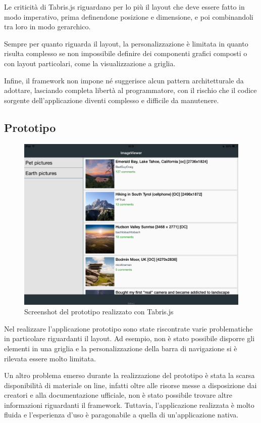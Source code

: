 Le criticità di Tabris.js riguardano per lo più il layout che deve essere fatto in modo imperativo, prima definendone posizione e dimensione, e poi combinandoli tra loro in modo gerarchico.

Sempre per quanto riguarda il layout, la personalizzazione è limitata in quanto risulta complesso se non impossibile definire dei componenti grafici composti o con layout particolari, come la visualizzazione a griglia.

Infine, il framework non impone né suggerisce alcun pattern architetturale da adottare, lasciando completa libertà al programmatore, con il rischio che il codice sorgente dell'applicazione diventi complesso e difficile da manutenere.

\subsection{Prototipo}

\begin{figure}[htp]
\centering
\includegraphics[width=\textwidth]{../immagini/prototipo-tabris}
\caption{Screenshot del prototipo realizzato con Tabris.js}  
\end{figure}

Nel realizzare l'applicazione prototipo sono state riscontrate varie problematiche in particolare riguardanti il layout.
Ad esempio, non è stato possibile disporre gli elementi in una griglia e la personalizzazione della barra di navigazione si è rilevata essere molto limitata.

Un altro problema emerso durante la realizzazione del prototipo è stata la scarsa disponibilità di materiale on line, infatti oltre alle risorse messe a disposizione dai creatori e alla documentazione ufficiale, non è stato possibile trovare altre informazioni riguardanti il framework.
Tuttavia, l'applicazione realizzata è molto fluida e l'esperienza d'uso è paragonabile a quella di un'applicazione nativa.

